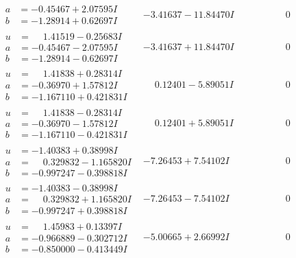 \documentclass[1p]{elsarticle_modified}
\theoremstyle{definition}
\begin{document}
$$\begin{array}{c|c|c}
\begin{aligned}
a &= -0.45467 + 2.07595 I \\
b &= -1.28914 + 0.62697 I\end{aligned}
 & -3.41637 - 11.84470 I & \phantom{-0.000000 } 0 \\ \hline\begin{aligned}
u &= \phantom{-}1.41519 - 0.25683 I \\
a &= -0.45467 - 2.07595 I \\
b &= -1.28914 - 0.62697 I\end{aligned}
 & -3.41637 + 11.84470 I & \phantom{-0.000000 } 0 \\ \hline\begin{aligned}
u &= \phantom{-}1.41838 + 0.28314 I \\
a &= -0.36970 + 1.57812 I \\
b &= -1.167110 + 0.421831 I\end{aligned}
 & \phantom{-}0.12401 - 5.89051 I & \phantom{-0.000000 } 0 \\ \hline\begin{aligned}
u &= \phantom{-}1.41838 - 0.28314 I \\
a &= -0.36970 - 1.57812 I \\
b &= -1.167110 - 0.421831 I\end{aligned}
 & \phantom{-}0.12401 + 5.89051 I & \phantom{-0.000000 } 0 \\ \hline\begin{aligned}
u &= -1.40383 + 0.38998 I \\
a &= \phantom{-}0.329832 - 1.165820 I \\
b &= -0.997247 - 0.398818 I\end{aligned}
 & -7.26453 + 7.54102 I & \phantom{-0.000000 } 0 \\ \hline\begin{aligned}
u &= -1.40383 - 0.38998 I \\
a &= \phantom{-}0.329832 + 1.165820 I \\
b &= -0.997247 + 0.398818 I\end{aligned}
 & -7.26453 - 7.54102 I & \phantom{-0.000000 } 0 \\ \hline\begin{aligned}
u &= \phantom{-}1.45983 + 0.13397 I \\
a &= -0.966889 - 0.302712 I \\
b &= -0.850000 - 0.413449 I\end{aligned}
 & -5.00665 + 2.66992 I & \phantom{-0.000000 } 0 \\ \hline\begin{aligned}

\end{aligned}
\end{array}$$
\end{document}
